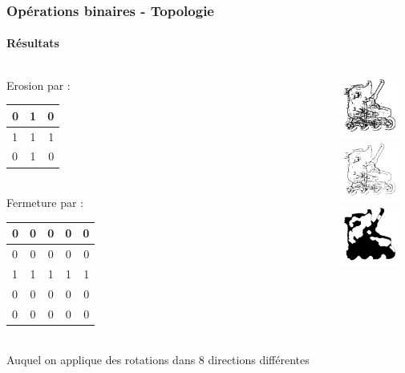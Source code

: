 \documentclass[french]{beamer}
\begin{document}
\begin{frame}
	\frametitle{Opérations binaires - Topologie}
	\framesubtitle{Résultats}
	\begin{columns}
		\begin{column}{5cm}
			Erosion par : \\
			\medskip
			\begin{tabular}{|l|c|r|}
				\hline
				0 & 1 & 0 \\ \hline
				1 & 1 & 1 \\ \hline
				0 & 1 & 0 \\
				\hline
			\end{tabular} \\
			\medskip
			Fermeture par : \\
			\medskip
			\begin{tabular}{|l|c|c|c|r|}
				\hline
				0 & 0 & 0 & 0 & 0 \\ \hline
				0 & 0 & 0 & 0 & 0 \\ \hline
				1 & 1 & 1 & 1 & 1 \\ \hline
				0 & 0 & 0 & 0 & 0 \\ \hline
				0 & 0 & 0 & 0 & 0 \\
				\hline
			\end{tabular} \\
			\medskip
			Auquel on applique des rotations dans 8 directions différentes
		\end{column}
		\begin{column}{5cm}
			\includegraphics[width=2cm]{images/roller_binn.jpg}\\
			\includegraphics[width=2cm]{images/roller_bin-n.jpg}\\
			\includegraphics[width=2cm]{images/roller_closedbinn.jpg}
		\end{column}
	\end{columns}
\end{frame}
\end{document}
